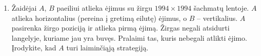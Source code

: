\begin{enumerate}
  \item {} Žaidėjai $A$, $B$ paeiliui atlieka ėjimus su
    žirgu  $1994\times 1994$ šachmatų lentoje. $A$ atlieka horizontalius (pereina
    į gretimą eilutę) ėjimus, o $B$ – vertikalius. $A$ pasirenka žirgo poziciją
    ir atlieka pirmą ėjimą. Žirgas negali atsidurti langelyje, kuriame jau
    yra buvęs. Pralaimi tas, kuris nebegali atlikti ėjimo. Įrodykite, kad $A$
    turi laiminčiąją strategiją.


\end{enumerate}
